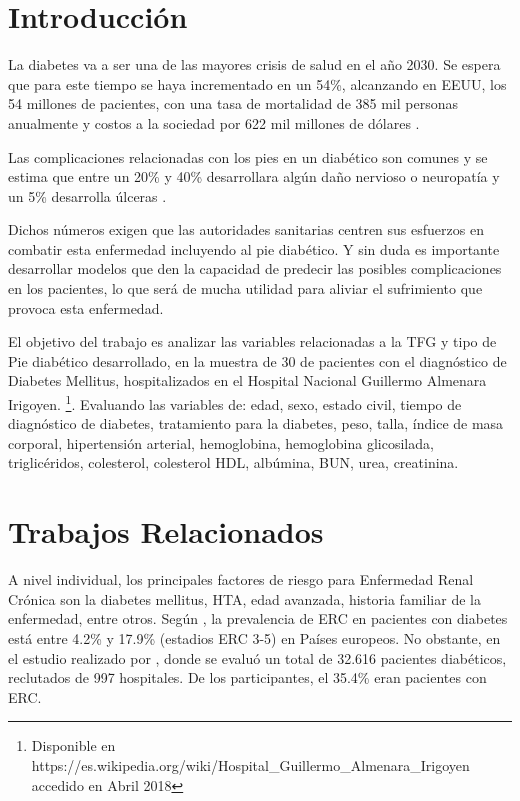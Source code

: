 \documentclass[runningheads,a4paper]{llncs}
\begin{document}
\section{Introducción}

La diabetes va a ser una de las mayores crisis de salud en el año 2030. Se espera que para este tiempo se haya incrementado en un 54\%, alcanzando en EEUU, los 54 millones de pacientes, con una tasa de mortalidad de 385 mil personas anualmente y costos a la sociedad por 622 mil millones de dólares \cite{rowley2017diabetes}. 

Las complicaciones relacionadas con los pies en un diabético son comunes y se estima que entre un 20\% y 40\% desarrollara algún daño nervioso o neuropatía y un 5\% desarrolla úlceras \cite{kumar1994prevalence}. 

Dichos números exigen que las autoridades sanitarias centren sus esfuerzos en combatir esta enfermedad incluyendo al pie diabético. Y sin duda es importante desarrollar modelos que den la capacidad de predecir las posibles complicaciones en los pacientes, lo que será de mucha utilidad para aliviar el sufrimiento que provoca esta enfermedad.

El objetivo del trabajo es analizar las variables relacionadas a la \ac{TFG} y tipo de Pie diabético desarrollado, en la muestra de 30 de pacientes con el diagnóstico de  Diabetes Mellitus,  hospitalizados en el  Hospital Nacional Guillermo Almenara Irigoyen. \footnote{Disponible en https://es.wikipedia.org/wiki/Hospital\_Guillermo\_Almenara\_Irigoyen accedido en Abril 2018 }. Evaluando las variables de:  edad, sexo, estado civil, tiempo de diagnóstico de diabetes, tratamiento para la diabetes, peso, talla, índice de masa corporal, hipertensión arterial, hemoglobina, hemoglobina glicosilada, triglicéridos, colesterol, colesterol HDL, albúmina, \ac{BUN}, urea, creatinina.


\section{Trabajos Relacionados}

A nivel individual, los principales factores de riesgo para Enfermedad Renal Crónica son la diabetes mellitus, \ac{HTA}, edad avanzada, historia familiar de la enfermedad, entre otros. Según \cite{hamada2018multiple}, la prevalencia de ERC en pacientes con diabetes está entre 4.2\% y 17.9\% (estadios ERC 3-5) en Países europeos. No obstante, en el estudio realizado por \cite{guenzani2018there}, donde se evaluó un total de 32.616 pacientes diabéticos, reclutados de 997 hospitales. De los participantes, el 35.4\% eran pacientes con ERC. 
\end{document}
